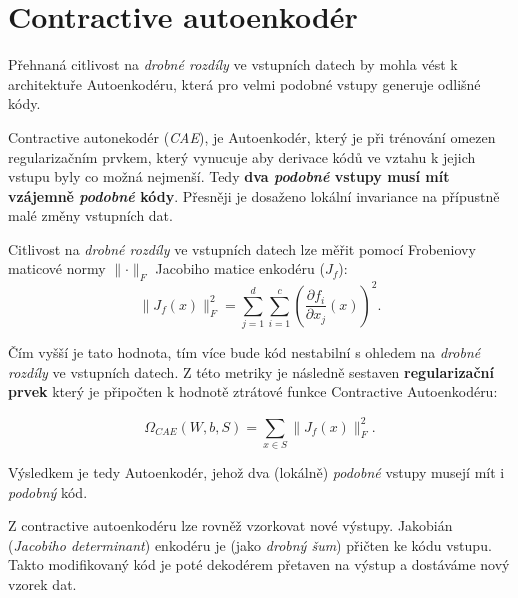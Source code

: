 \section{Contractive autoenkodér}
\label{sec:contractive_autoencoder}
Přehnaná citlivost na \emph{drobné rozdíly} ve vstupních datech by mohla vést k architektuře Autoenkodéru, která pro velmi podobné vstupy generuje odlišné kódy.

Contractive autonekodér (\emph{CAE}), je Autoenkodér, který je při trénování omezen regularizačním prvkem,
který vynucuje aby derivace kódů ve vztahu k jejich vstupu byly co možná nejmenší.
Tedy \textbf{dva \emph{podobné} vstupy musí mít vzájemně \emph{podobné} kódy}.
Přesněji je dosaženo lokální invariance na přípustně malé změny vstupních dat. \cite{Rifai2012}

Citlivost na \emph{drobné rozdíly} ve vstupních datech lze měřit pomocí Frobeniovy maticové normy $\lVert \cdot \rVert_F$ Jacobiho matice enkodéru ($J_f$):
\begin{equation}
    \lVert J_f(x) \rVert^2_F = \sum_{j=1}^{d}\sum_{i=1}^{c} \left( \frac{\partial f_i}{\partial x_j} (x) \right) ^2 .
\end{equation}

Čím vyšší je tato hodnota, tím více bude kód nestabilní s ohledem na \emph{drobné rozdíly} ve vstupních datech.
Z této metriky je následně sestaven \textbf{regularizační prvek} který je připočten k hodnotě ztrátové funkce Contractive Autoenkodéru:

\begin{equation}
    \Omega_{CAE} (W, b, S) = \sum_{x \in S}^{} \lVert J_f(x) \rVert^2_F .
\end{equation}

Výsledkem je tedy Autoenkodér, jehož dva (lokálně) \emph{podobné} vstupy musejí mít i \emph{podobný} kód. \cite{Charte2018}

Z contractive autoenkodéru lze rovněž vzorkovat nové výstupy.
Jakobián (\emph{Jacobiho determinant}) enkodéru je (jako \emph{drobný šum}) přičten ke kódu vstupu.
Takto modifikovaný kód je poté dekodérem přetaven na výstup a dostáváme nový vzorek dat. \cite{Goodfellow2016}